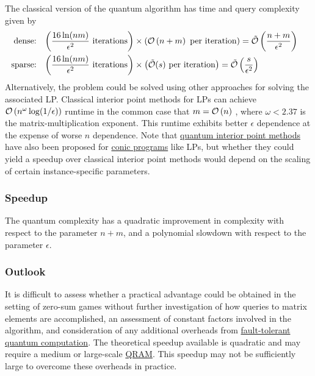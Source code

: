 \begin{refsection}
The classical version of the quantum algorithm has time and query complexity given by \cite[Section 2]{apeldoorn2019QAlgorithmsForZeroSumGames}
\begin{align}
\text{dense:} \;\;\; & \left(\frac{16\ln(nm)}{\epsilon^2} \text{ iterations}\right)\times \left(\mathcal{O}\left( n+m \right) \text{ per iteration}\right) = \tilde{\mathcal{O}}\left(\frac{n+m}{\epsilon^2}\right)\\
\text{sparse:} \;\;\; & \left(\frac{16\ln(nm)}{\epsilon^2} \text{ iterations}\right)\times \left(\tilde{\mathcal{O}}(s) \text{ per iteration}\right) = \tilde{\mathcal{O}}\left(\frac{s}{\epsilon^{2}}\right)& 
\end{align}
Alternatively, the problem could be solved using other approaches for solving the associated LP. Classical interior point methods for LPs can achieve $\mathcal{O}\left( n^{\omega}\log(1/\epsilon) \right)$ runtime in the common case that $m=\mathcal{O}\left( n \right)$ \cite{cohen2021LPsinMMtime}, where $\omega < 2.37$ is the matrix-multiplication exponent. This runtime exhibits better $\epsilon$ dependence at the expense of worse $n$ dependence. Note that \hyperref[prim:QIPM]{quantum interior point methods} have also been proposed for \hyperref[appl:ConicProgramming]{conic programs} like LPs, but whether they could yield a speedup over classical interior point methods would depend on the scaling of certain instance-specific parameters.

\subsubsection*{Speedup}

The quantum complexity has a quadratic improvement in complexity with respect to the parameter $n+m$, and a polynomial slowdown with respect to the parameter $\epsilon$. 

\subsubsection*{Outlook}

It is difficult to assess whether a practical advantage could be obtained in the setting of zero-sum games without further investigation of how queries to matrix elements are accomplished, an assessment of constant factors involved in the algorithm, and consideration of any additional overheads from \hyperref[prim:FTQC]{fault-tolerant quantum computation}. The theoretical speedup available is quadratic and may require a medium or large-scale \hyperref[prim:QRAM]{QRAM}. This speedup may not be sufficiently large to overcome these overheads in practice. 


\end{refsection}
